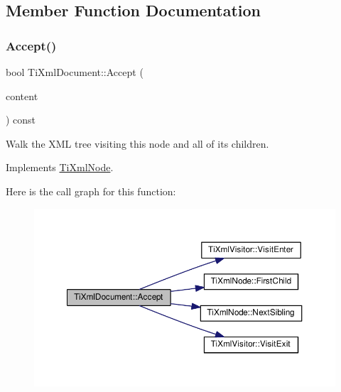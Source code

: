 \subsection{Member Function Documentation}
\mbox{\label{class_ti_xml_document_a8ddd6eec722cbd25900bbac664909bac}} 
\subsubsection{\texorpdfstring{Accept()}{Accept()}}
{\footnotesize\ttfamily bool Ti\+Xml\+Document\+::\+Accept (\begin{DoxyParamCaption}\item[{\hyperlink{class_ti_xml_visitor}{Ti\+Xml\+Visitor} $\ast$}]{content }\end{DoxyParamCaption}) const\hspace{0.3cm}{\ttfamily [virtual]}}

Walk the X\+ML tree visiting this node and all of its children. 

Implements \hyperlink{class_ti_xml_node_acc0f88b7462c6cb73809d410a4f5bb86}{Ti\+Xml\+Node}.

Here is the call graph for this function\+:\nopagebreak
\begin{figure}[H]
\begin{center}
\leavevmode
\includegraphics[width=350pt]{class_ti_xml_document_a8ddd6eec722cbd25900bbac664909bac_cgraph}
\end{center}
\end{figure}
\mbox{\label{class_ti_xml_document_ac66b8c28db86363315712a3574e87c35}} 
